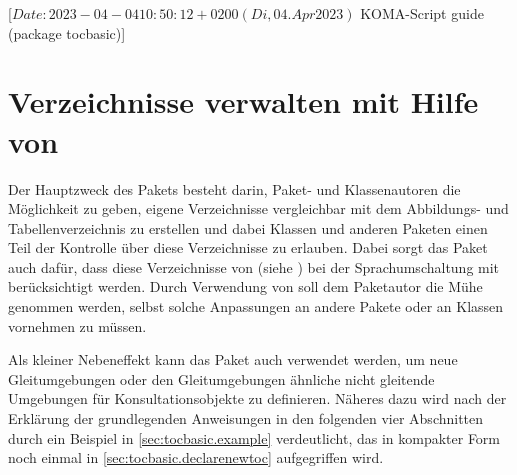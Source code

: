 %
%
%
%
%
%
%

                 [$Date: 2023-04-04 10:50:12 +0200 (Di, 04. Apr 2023) $
                  KOMA-Script guide (package tocbasic)]

\chapter{Verzeichnisse verwalten mit Hilfe von }

\BeginIndexGroup
{}%
%
%
Der Hauptzweck des Pakets  besteht darin, Paket- und
Klassenautoren die Möglichkeit zu geben, eigene Verzeichnisse vergleichbar mit
dem Abbildungs- und Tabellenverzeichnis zu erstellen und dabei Klassen und
anderen Paketen einen Teil der Kontrolle über diese Verzeichnisse zu
erlauben. Dabei sorgt das Paket  auch dafür, dass diese
Verzeichnisse von  (siehe
\cite{package:babel}) bei der Sprachumschaltung mit berücksichtigt
werden. Durch Verwendung von  soll dem Paketautor die Mühe
genommen werden, selbst solche Anpassungen an andere Pakete oder an Klassen
vornehmen zu müssen.

Als kleiner Nebeneffekt kann das Paket auch verwendet werden, um neue
Gleitumgebungen oder den Gleitumgebungen ähnliche nicht gleitende Umgebungen
für Konsultationsobjekte zu definieren. Näheres dazu wird nach der Erklärung
der grundlegenden Anweisungen in den folgenden vier Abschnitten durch ein
Beispiel in \autoref{sec:tocbasic.example} verdeutlicht, das in kompakter Form
noch einmal in \autoref{sec:tocbasic.declarenewtoc} aufgegriffen wird.

